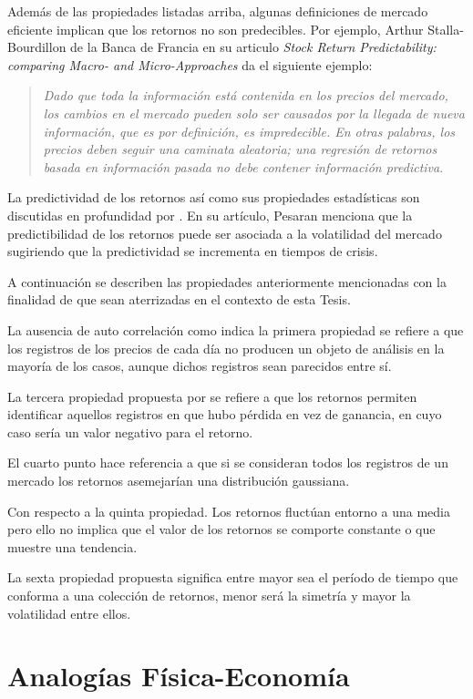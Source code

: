 Además de las propiedades listadas arriba, algunas definiciones de mercado eficiente implican que los retornos no son predecibles. Por ejemplo, Arthur Stalla-Bourdillon de la Banca de Francia en su articulo \textit{Stock Return Predictability: comparing Macro- and Micro-Approaches} \citep{stalla-bourdillon_stock_2022} da el siguiente ejemplo:
\begin{quotation}
\textit{Dado que toda la información está contenida en los precios del mercado, los cambios en el mercado pueden solo ser causados por la llegada de nueva información, que es por definición, es impredecible. En otras palabras, los precios deben seguir una caminata aleatoria; una regresión de retornos basada en información pasada no debe contener información predictiva}.
\end{quotation}
La predictividad de los retornos así como sus propiedades estadísticas son discutidas en profundidad por \cite{Pesaran2010}.
En su artículo, Pesaran menciona que la predictibilidad de los retornos puede ser asociada a la volatilidad del mercado sugiriendo que la predictividad se incrementa en tiempos de crisis. 

A continuación se describen las propiedades anteriormente mencionadas con la finalidad de que sean aterrizadas en el contexto de esta Tesis.

La ausencia de auto correlación como indica la primera propiedad se refiere a que los registros de los precios de cada día no producen un objeto de análisis en la mayoría de los casos, aunque dichos registros sean parecidos entre sí.

La tercera propiedad propuesta por \cite{Cont2001} se refiere a que los retornos  permiten identificar aquellos registros en que hubo pérdida en vez de ganancia, en cuyo caso sería un valor negativo para el retorno.

El cuarto punto hace referencia a que si se consideran todos los registros de un mercado los retornos asemejarían una distribución gaussiana.

Con respecto a la quinta propiedad. Los retornos fluctúan entorno a una media pero ello no implica que el valor de los retornos se comporte constante o que muestre una tendencia.

La sexta propiedad propuesta significa entre mayor sea el período de tiempo que conforma a una colección de retornos, menor será la simetría y mayor la volatilidad entre ellos.

\section{Analogías Física-Economía} 
